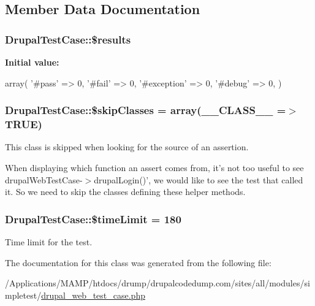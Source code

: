 \subsection{Member Data Documentation}
\hypertarget{class_drupal_test_case_a0367dfff47c6fd9879879fd145f2cc30}{
\subsubsection[{\$results}]{\setlength{\rightskip}{0pt plus 5cm}DrupalTestCase::\$results}}
\label{class_drupal_test_case_a0367dfff47c6fd9879879fd145f2cc30}
{\bfseries Initial value:}
\begin{DoxyCode}
 array(
    '#pass' => 0,
    '#fail' => 0,
    '#exception' => 0,
    '#debug' => 0,
  )
\end{DoxyCode}
\hypertarget{class_drupal_test_case_a2b29918aec212576b048e0ffa8fd5b89}{
\subsubsection[{\$skipClasses}]{\setlength{\rightskip}{0pt plus 5cm}DrupalTestCase::\$skipClasses = array(\_\-\_\-CLASS\_\-\_\- =$>$ TRUE)}}
\label{class_drupal_test_case_a2b29918aec212576b048e0ffa8fd5b89}
This class is skipped when looking for the source of an assertion.

When displaying which function an assert comes from, it's not too useful to see drupalWebTestCase-\/$>$drupalLogin()', we would like to see the test that called it. So we need to skip the classes defining these helper methods. \hypertarget{class_drupal_test_case_a3718dfe6f376857a54eff711c720ed01}{
\subsubsection[{\$timeLimit}]{\setlength{\rightskip}{0pt plus 5cm}DrupalTestCase::\$timeLimit = 180}}
\label{class_drupal_test_case_a3718dfe6f376857a54eff711c720ed01}
Time limit for the test. 

The documentation for this class was generated from the following file:\begin{DoxyCompactItemize}
\item 
/Applications/MAMP/htdocs/drump/drupalcodedump.com/sites/all/modules/simpletest/\hyperlink{drupal__web__test__case_8php}{drupal\_\-web\_\-test\_\-case.php}\end{DoxyCompactItemize}
